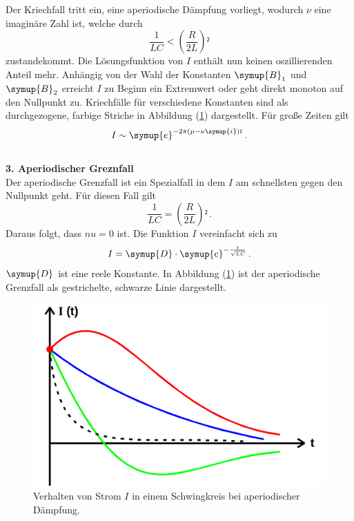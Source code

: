 Der Kriechfall tritt ein, eine aperiodische Dämpfung vorliegt, wodurch
 $\nu$ eine imaginäre Zahl ist, welche durch 
\begin{equation*}
    \frac{1}{LC} < \left(\frac{R}{2L}\right)² 
\end{equation*}
zustandekommt. Die Lösungsfunktion von $I$ enthält nun keinen oszillierenden Anteil mehr. 
Anhängig von der Wahl der Konstanten $\symup{B}_1$ und $\symup{B}_2$ erreicht $I$ zu Beginn ein Extremwert 
oder geht direkt monoton auf den Nullpunkt zu. Kriechfälle für verschiedene Konstanten 
sind als durchgezogene, farbige Striche in Abbildung (\ref{pic:aperiodische_Daempfung})
dargestellt. 
Für große Zeiten gilt
\begin{equation*}
    I \sim \symup{e}^{- 2\pi \left(\mu - \nu \symup{i}\right)t}\, . 
\end{equation*}
 \\
\textbf{3. Aperiodischer Greznfall}\\
Der aperiodische Grenzfall ist ein Spezialfall in dem $I$ am schnellsten gegen den 
Nullpunkt geht. 
Für diesen Fall gilt 
\begin{equation*}
    \frac{1}{LC} = \left(\frac{R}{2L}\right)² \, .
\end{equation*}
Daraus folgt, dass $nu = 0$ ist. Die Funktion $I$ vereinfacht sich zu
\begin{equation*}
    I = \symup{D} \cdot \symup{e}^{- \frac{t}{\sqrt{L C}}} \, .
\end{equation*} 
$\symup{D}$ ist eine reele Konstante. In Abbildung (\ref{pic:aperiodische_Daempfung})
ist der aperiodische Grenzfall als gestrichelte, schwarze Linie dargestellt. 

\begin{figure}[H]
    \centering
    \includegraphics[width=0.7\linewidth]{Aperiodische_Daempfung_Abbildung.png}
    \caption{Verhalten von Strom $I$ in einem Schwingkreis bei aperiodischer Dämpfung.}
    \label{pic:aperiodische_Daempfung}
\end{figure}

